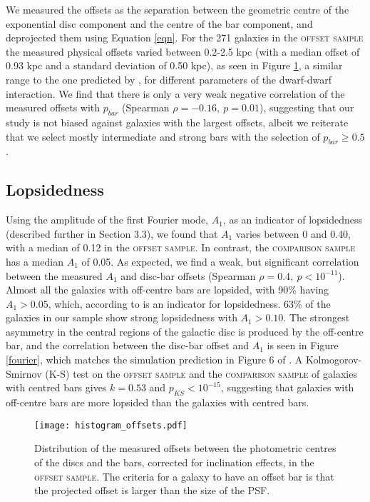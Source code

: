 \documentclass[a4paper,fleqn,usenatbib,useAMS]{mnras}
\begin{document}
We measured the offsets as the separation between the geometric centre of the exponential disc component and the centre of the bar component, and deprojected them using Equation \ref{eqn}. For the 271 galaxies in the \textsc{offset sample} the measured physical offsets varied between 0.2-2.5 kpc (with a median offset of 0.93 kpc and a standard deviation of 0.50 kpc), as seen in Figure \ref{offset}, a similar range to the one predicted by \citet{Pardy2016}, for different parameters of the dwarf-dwarf interaction. We find that there is only a very weak negative correlation of the measured offsets with $p_{bar}$ (Spearman $\rho=-0.16,\:p=0.01$), suggesting that our study is not biased against galaxies with the largest offsets, albeit we reiterate that we select mostly intermediate and strong bars with the selection of $p_{bar}\geq0.5$.

\subsection{Lopsidedness}

Using the amplitude of the first Fourier mode, $A_{1}$, as an indicator of lopsidedness (described  further in Section 3.3), we found that $A_{1}$ varies between 0 and 0.40, with a median of 0.12 in the \textsc{offset sample}. In contrast, the \textsc{comparison sample} has a median $A_{1}$ of 0.05. As expected, we find a weak, but significant correlation between the measured $A_{1}$ and disc-bar offsets (Spearman $\rho=0.4,\:p<10^{-11}$). Almost all the galaxies with off-centre bars are lopsided, with 90\% having $A_{1}>0.05$, which, according to \citet{Bournaud2005} is an indicator for lopsidedness. 63\% of the galaxies in our sample show strong lopsidedness with $A_{1}>0.10$. The strongest asymmetry in the central regions of the galactic disc is produced by the off-centre bar, and the correlation between the disc-bar offset and $A_{1}$ is seen in Figure \ref{fourier}, which matches the simulation prediction in Figure 6 of \citet{Pardy2016}. A Kolmogorov-Smirnov (K-S) test on the \textsc{offset sample} and the \textsc{comparison sample} of galaxies with centred bars gives $k=0.53$ and $p_{KS}<10^{-15}$, suggesting that galaxies with off-centre bars are more lopsided than the galaxies with centred bars.

\begin{figure}
 \texttt{[image: histogram\_offsets.pdf]}
 \caption{Distribution of the measured offsets between the photometric centres of the discs and the bars, corrected for inclination effects, in the \textsc{offset sample}. The criteria for a galaxy to have an offset bar is that the projected offset is larger than the size of the PSF. }
 \label{offset}
\end{figure}
\end{document}
